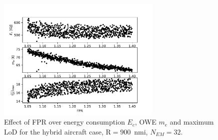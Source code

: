 \begin{figure}[!h]
	\centering
	\includegraphics[keepaspectratio, width=0.7\textwidth]{images/app_sens_plot/hybrid_dep_sens_an_geom_fpr}
	\caption{Effect of FPR over energy consumption $E_c$, OWE $m_e$ and maximum LoD for the hybrid aircraft case, $\textrm{R}=900$~nmi, $N_{EM}=32$.}
	\label{fig:hybrid_dep_geom_sens_an_fpr}
\end{figure}